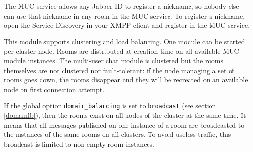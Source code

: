 \documentclass[a4paper,10pt]{book}
\newcommand{\option}[1]{\texttt{#1}}
\newcommand{\term}[1]{\texttt{#1}}
\begin{document}
The MUC service allows any Jabber ID to register a nickname,
so nobody else can use that nickname in any room in the MUC service.
To register a nickname, open the Service Discovery in your
XMPP client and register in the MUC service.

This module supports clustering and load
balancing. One module can be started per cluster node. Rooms are
distributed at creation time on all available MUC module
instances. The multi-user chat module is clustered but the rooms
themselves are not clustered nor fault-tolerant: if the node managing a
set of rooms goes down, the rooms disappear and they will be recreated
on an available node on first connection attempt.

If the global option \option{domain\_balancing} is set to \term{broadcast}
(see section \ref{domainlb}),
then the rooms exist on all nodes of the cluster at the same time.
It means that all messages published
on one instance of a room are broadcasted to the instances of the same
rooms on all clusters. To avoid useless traffic, this broadcast is
limited to non empty room instances.
\end{document}
